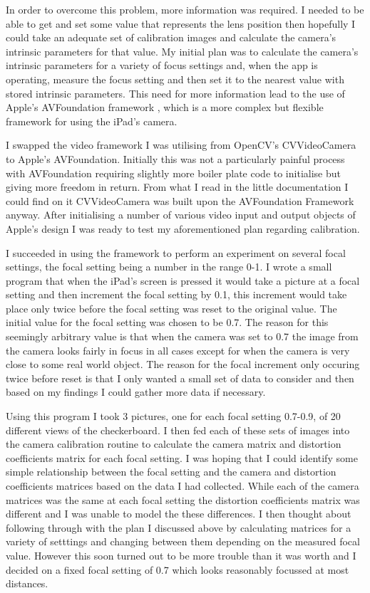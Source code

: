 \documentclass{article}
\begin{document}
In order to overcome this problem, more information was required. I needed to be able to get and set some value that represents the lens position \cite{xamarin} then hopefully I could take an adequate set of calibration images and calculate the camera's intrinsic parameters for that value. My initial plan was to calculate the camera's intrinsic parameters for a variety of focus settings and, when the app is operating, measure the focus setting and then set it to the nearest value with stored intrinsic parameters. This need for more information lead to the use of Apple's AVFoundation framework \cite{apple_class}, which is a more complex but flexible framework for using the iPad's camera. 

I swapped the video framework I was utilising from OpenCV's CVVideoCamera to Apple's AVFoundation. Initially this was not a particularly painful process with AVFoundation requiring slightly more boiler plate code to initialise but giving more freedom in return. From what I read in the little documentation I could find on it CVVideoCamera was built upon the AVFoundation Framework anyway. After initialising a number of various video input and output objects of Apple's design I was ready to test my aforementioned plan regarding calibration. 

I succeeded in using the framework to perform an experiment on several focal settings, the focal setting being a number in the range 0-1. I wrote a small program that when the iPad's screen is pressed it would take a picture at a focal setting and then increment the focal setting by 0.1, this increment would take place only twice before the focal setting was reset to the original value. The initial value for the focal setting was chosen to be 0.7. The reason for this seemingly arbitrary value is that when the camera was set to 0.7 the image from the camera looks fairly in focus in all cases except for when the camera is very close to some real world object. The reason for the focal increment only occuring twice before reset is that I only wanted a small set of data to consider and then based on my findings I could gather more data if necessary. \par

Using this program I took 3 pictures, one for each focal setting 0.7-0.9, of 20 different views of the checkerboard. I then fed each of these sets of images into the camera calibration routine to calculate the camera matrix and distortion coefficients matrix for each focal setting. I was hoping that I could identify some simple relationship between the focal setting and the camera and distortion coefficients matrices based on the data I had collected. While each of the camera matrices was the same at each focal setting the distortion coefficients matrix was different and I was unable to model the these differences. I then thought about following through with the plan I discussed above by calculating matrices for a variety of setttings and changing between them depending on the measured focal value. However this soon turned out to be more trouble than it was worth and I decided on a fixed focal setting of 0.7 which looks reasonably focussed at most distances.
\end{document}
